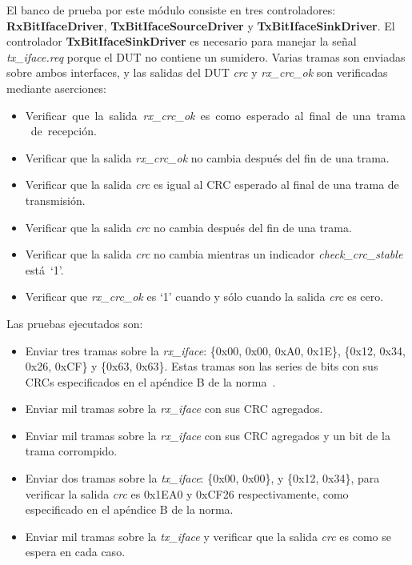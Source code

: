 \documentclass[a4paper, twoside, 11pt]{report}
\begin{document}
El banco de prueba por este módulo consiste en tres controladores: \textbf{RxBitIfaceDriver}, \textbf{TxBitIfaceSourceDriver} y \textbf{TxBitIfaceSinkDriver}. El controlador  \textbf{TxBitIfaceSinkDriver} es necesario para manejar la señal \textit{tx\_iface.req} porque el DUT no contiene un sumidero. Varias tramas son enviadas sobre ambos interfaces, y las salidas del DUT \textit{crc} y \textit{rx\_crc\_ok} son verificadas mediante aserciones:

\begin{itemize}
  \item \mbox{Verificar que la salida \textit{rx\_crc\_ok} es como esperado al final de una trama de recepción.}
  \item Verificar que la salida \textit{rx\_crc\_ok} no cambia después del fin de una trama.
  \item Verificar que la salida \textit{crc} es igual al CRC esperado al final de una trama de transmisión.
  \item Verificar que la salida \textit{crc} no cambia después del fin de una trama.
  \item Verificar que la salida \textit{crc} no cambia mientras un indicador \textit{check\_crc\_stable} está~‘1’.
  \item Verificar que \textit{rx\_crc\_ok} es ‘1’ cuando y sólo cuando la salida \textit{crc} es cero.
\end{itemize}

Las pruebas ejecutados son:

\begin{itemize}
  \item Enviar tres tramas sobre la \textit{rx\_iface}: \{0x00, 0x00, 0xA0, 0x1E\}, \{0x12, 0x34, 0x26, 0xCF\} y \{0x63, 0x63\}. Estas tramas son las series de bits con sus CRCs especificados en el apéndice B de la norma~\cite{iso14443-3}.
  \item Enviar mil tramas sobre la \textit{rx\_iface} con sus CRC agregados.
  \item Enviar mil tramas sobre la \textit{rx\_iface} con sus CRC agregados y un bit de la trama corrompido.
  \item Enviar dos tramas sobre la \textit{tx\_iface}: \{0x00, 0x00\}, y \{0x12, 0x34\}, para verificar la salida \textit{crc} es 0x1EA0 y 0xCF26 respectivamente, como especificado en el apéndice B de la norma.
  \item Enviar mil tramas sobre la \textit{tx\_iface} y verificar que la salida \textit{crc} es como se espera en cada caso.
\end{itemize}
\end{document}
